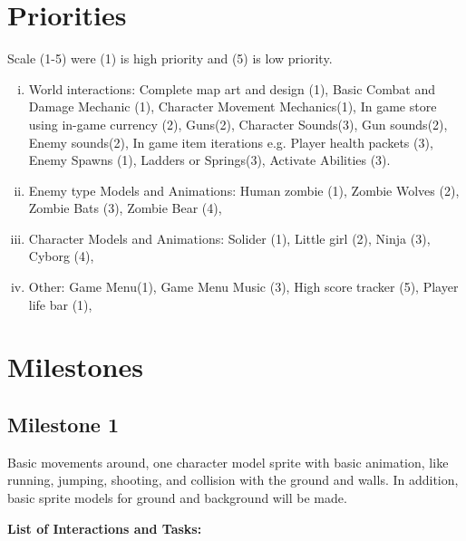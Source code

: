 \documentclass{article}
\begin{document}
\section{Priorities}
Scale (1-5) were (1) is high priority and (5) is low priority. 
\begin{enumerate}[(i)]
    \item World interactions: Complete map art and design (1), Basic Combat and Damage Mechanic (1), Character Movement Mechanics(1), In game store using in-game currency (2), Guns(2), Character Sounds(3), Gun sounds(2), Enemy sounds(2), In game item iterations e.g. Player health packets (3), Enemy Spawns (1), Ladders or Springs(3), Activate Abilities (3).
    \item Enemy type Models and Animations: Human zombie (1), Zombie Wolves (2), Zombie Bats (3), Zombie Bear (4),
    \item Character Models and Animations: Solider (1), Little girl (2), Ninja (3), Cyborg (4),
    \item Other: Game Menu(1), Game Menu Music (3), High score tracker (5), Player life bar (1),
\end{enumerate}


\section{Milestones}
\subsection{Milestone 1}
    Basic movements around, one character model sprite with basic animation, like running, jumping, shooting, and collision with the ground and walls.
    In addition, basic sprite models for ground and background will be made.
\smallskip

\textbf{List of Interactions and Tasks:}
\end{document}

